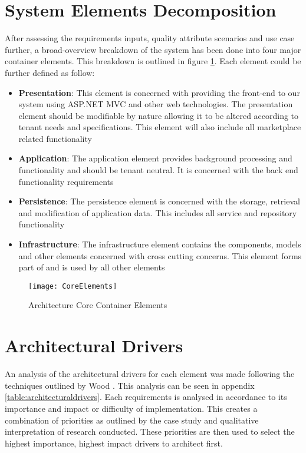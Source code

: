 \section{System Elements Decomposition}
After assessing the requirements inputs, quality attribute scenarios and use case further, a broad-overview breakdown of the system has been done into four major container elements. This breakdown is outlined in figure \ref{fig:elements}. Each element could be further defined as follow:
\begin{itemize}
\item \textbf{Presentation}: This element is concerned with providing the front-end to our system using ASP.NET MVC and other web technologies. The presentation element should be modifiable by nature allowing it to be altered according to tenant needs and specifications. This element will also include all marketplace related functionality
\item \textbf{Application}: The application element provides background processing and functionality and should be tenant neutral. It is concerned with the back end functionality requirements
\item \textbf{Persistence}: The persistence element is concerned with the storage, retrieval and modification of application data. This includes all service and repository functionality
\item \textbf{Infrastructure}: The infrastructure element contains the components, models and other elements concerned with cross cutting concerns. This element forms part of and is used by all other elements
\end{itemize}

\begin{figure}
\centering
\texttt{[image: CoreElements]}
\caption{Architecture Core Container Elements}
\label{fig:elements}
\end{figure}


\section{Architectural Drivers}
 \label{sec:arcdrivers}
An analysis of the architectural drivers for each element was made following the techniques outlined by Wood \cite{Wood2007}. This analysis can be seen in appendix \ref{table:architecturaldrivers}. Each requirements is analysed in accordance to its importance and impact or difficulty of implementation. This creates a combination of priorities as outlined by the case study and qualitative interpretation of research conducted. These priorities are then used to select the highest importance, highest impact drivers to architect first. 

